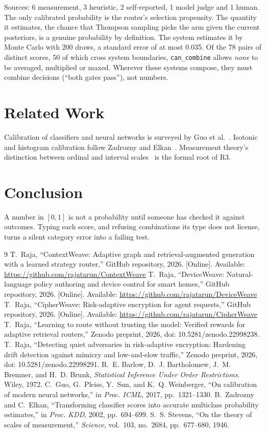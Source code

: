 \documentclass[conference]{IEEEtran}
\begin{document}
Sources: 6 measurement, 3 heuristic, 2 self-reported, 1 model judge and 1 human. The only calibrated probability is the router's selection propensity. The quantity it estimates, the chance that Thompson sampling picks the arm given the current posteriors, is a genuine probability by definition. The system estimates it by Monte Carlo with 200 draws, a standard error of at most 0.035. Of the 78 pairs of distinct scores, 50 of which cross system boundaries, \texttt{can\_combine} allows \emph{none} to be averaged, multiplied or maxed. Wherever these systems compose, they must combine decisions (``both gates pass''), not numbers.

\section{Related Work}
Calibration of classifiers and neural networks is surveyed by Guo et al.~\cite{guo2017}. Isotonic and histogram calibration follow Zadrozny and Elkan~\cite{zadrozny2002}. Measurement theory's distinction between ordinal and interval scales~\cite{stevens1946} is the formal root of R3.

\section{Conclusion}
A number in $[0,1]$ is not a probability until someone has checked it against outcomes. Typing each score, and refusing combinations its type does not license, turns a silent category error into a failing test.

\begin{thebibliography}{9}
 T.~Raja, ``ContextWeave: Adaptive graph and retrieval-augmented generation with a learned strategy router,'' GitHub repository, 2026. [Online]. Available: \url{https://github.com/rajatarun/ContextWeave}
 T.~Raja, ``DeviceWeave: Natural-language policy authoring and device control for smart homes,'' GitHub repository, 2026. [Online]. Available: \url{https://github.com/rajatarun/DeviceWeave}
 T.~Raja, ``CipherWeave: Risk-adaptive encryption for agent requests,'' GitHub repository, 2026. [Online]. Available: \url{https://github.com/rajatarun/CipherWeave}
 T.~Raja, ``Learning to route without trusting the model: Verified rewards for adaptive retrieval routers,'' Zenodo preprint, 2026, doi: 10.5281/zenodo.22998238.
 T.~Raja, ``Detecting quiet adversaries in risk-adaptive encryption: Hardening drift detection against mimicry and low-and-slow traffic,'' Zenodo preprint, 2026, doi: 10.5281/zenodo.22998291.
 R.~E. Barlow, D.~J. Bartholomew, J.~M. Bremner, and H.~D. Brunk, \emph{Statistical Inference Under Order Restrictions}. Wiley, 1972.
 C.~Guo, G.~Pleiss, Y.~Sun, and K.~Q. Weinberger, ``On calibration of modern neural networks,'' in \emph{Proc. ICML}, 2017, pp.~1321--1330.
 B.~Zadrozny and C.~Elkan, ``Transforming classifier scores into accurate multiclass probability estimates,'' in \emph{Proc. KDD}, 2002, pp.~694--699.
 S.~S. Stevens, ``On the theory of scales of measurement,'' \emph{Science}, vol.~103, no.~2684, pp.~677--680, 1946.
\end{thebibliography}
\end{document}

